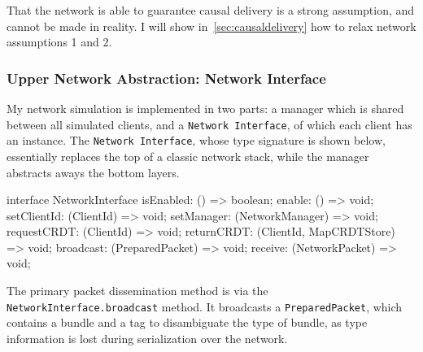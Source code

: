 \documentclass[12pt,a4paper,twoside,openright]{report}
\begin{document}
		That the network is able to guarantee causal delivery is a strong assumption, and cannot be made in reality. I will show in~\cref{sec:causaldelivery} how to relax network assumptions 1 and 2.
		

		\subsubsection{Upper Network Abstraction: Network Interface} \label{sec:network:networkinterface}
		My network simulation is implemented in two parts: a manager which is shared between all simulated clients, and a \texttt{Network Interface}, of which each client has an instance. The \texttt{Network Interface}, whose type signature is shown below, essentially replaces the top of a classic network stack, while the manager abstracts aways the bottom layers.
		
\begin{typescript}
interface NetworkInterface {
	isEnabled: () => boolean;
	enable: () => void;
	setClientId: (ClientId) => void;
	setManager: (NetworkManager) => void;
	requestCRDT: (ClientId) => void;
	returnCRDT: (ClientId, MapCRDTStore) => void;
	broadcast: (PreparedPacket) => void;
	receive: (NetworkPacket) => void;
}
\end{typescript}

		The primary packet dissemination method is via the \texttt{NetworkInterface.broadcast} method. It broadcasts a \texttt{PreparedPacket}, which contains a bundle and a tag to disambiguate the type of bundle, as type information is lost during serialization over the network.
\end{document}
